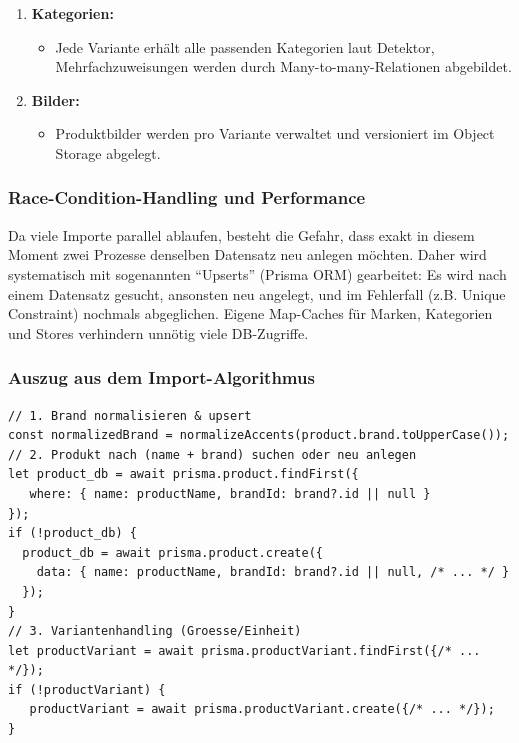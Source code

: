 \documentclass[12pt, a4paper]{report} %
\begin{document}
\begin{enumerate}
    \item \textbf{Kategorien:}
        \begin{itemize}
            \item Jede Variante erhält alle passenden Kategorien laut Detektor, Mehrfachzuweisungen werden durch Many-to-many-Relationen abgebildet.
        \end{itemize}
    \item \textbf{Bilder:}
        \begin{itemize}
            \item Produktbilder werden pro Variante verwaltet und versioniert im Object Storage abgelegt.
        \end{itemize}
\end{enumerate}

\subsubsection{Race-Condition-Handling und Performance}
Da viele Importe parallel ablaufen, besteht die Gefahr, dass exakt in diesem Moment zwei Prozesse denselben Datensatz neu anlegen möchten. Daher wird systematisch mit sogenannten "`Upserts"' (Prisma ORM) gearbeitet: Es wird nach einem Datensatz gesucht, ansonsten neu angelegt, und im Fehlerfall (z.B. Unique Constraint) nochmals abgeglichen. Eigene Map-Caches für Marken, Kategorien und Stores verhindern unnötig viele DB-Zugriffe.

\subsubsection{Auszug aus dem Import-Algorithmus}
\begin{lstlisting}[style=typescriptstyle, caption={Produkt-Import: Algorithmus bei Name-Matching und DB-Schreibvorgang}]
// 1. Brand normalisieren & upsert
const normalizedBrand = normalizeAccents(product.brand.toUpperCase());
// 2. Produkt nach (name + brand) suchen oder neu anlegen
let product_db = await prisma.product.findFirst({
   where: { name: productName, brandId: brand?.id || null }
});
if (!product_db) {
  product_db = await prisma.product.create({
    data: { name: productName, brandId: brand?.id || null, /* ... */ }
  });
}
// 3. Variantenhandling (Groesse/Einheit)
let productVariant = await prisma.productVariant.findFirst({/* ... */});
if (!productVariant) {
   productVariant = await prisma.productVariant.create({/* ... */});
}
\end{lstlisting}
\end{document}
